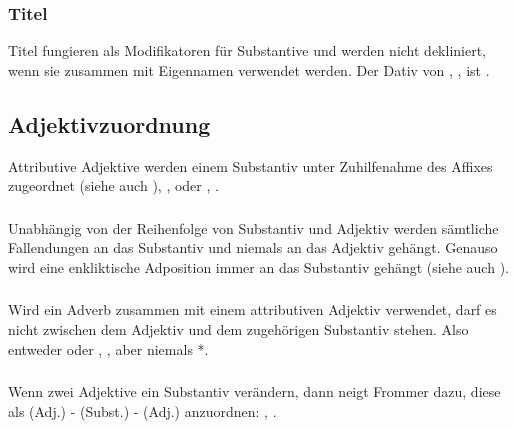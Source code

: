 \subsubsection{Titel} Titel fungieren als Modifikatoren f\"ur Substantive und werden
nicht dekliniert, wenn sie zusammen mit Eigennamen verwendet werden. Der Dativ von
, , ist .

\subsection{Adjektivzuordnung} Attributive Adjektive werden einem Substantiv unter
Zuhilfenahme des Affixes  zugeordnet (siehe auch ),
,
 oder
, .
\label{syn:adj:attr}

\subsubsection{} Unabh\"angig von der Reihenfolge von Substantiv und Adjektiv
werden s\"amtliche Fallendungen an das Substantiv und niemals an das Adjektiv
geh\"angt. Genauso wird eine enkliktische Adposition immer an das Substantiv
geh\"angt (siehe auch ).

\subsubsection{} Wird ein Adverb zusammen mit einem attributiven Adjektiv verwendet,
darf es nicht zwischen dem Adjektiv und dem zugeh\"origen Substantiv stehen. Also
entweder  oder
, , aber niemals
*.

\subsubsection{} Wenn zwei Adjektive ein Substantiv ver\"andern, dann neigt Frommer
dazu, diese als (Adj.) - (Subst.) - (Adj.) anzuordnen: ,
.

